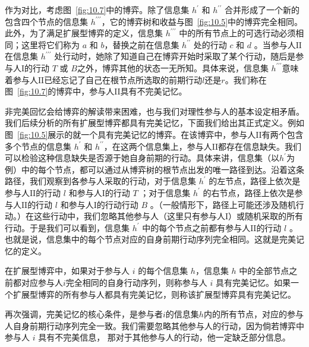 作为对比，考虑图~\ref{fig:10.7}中的博弈。除了信息集 \({h}^{\prime }\) 和 \({h}^{\prime \prime }\) 合并形成了一个新的包含四个节点的信息集 \({h}^{\prime \prime \prime }\)，它的博弈树和收益与图~\ref{fig:10.5}中的博弈完全相同。此外，为了满足扩展型博弈的定义，信息集 \({h}^{\prime \prime \prime }\) 中的所有节点上的可选行动必须相同；这里将它们称为 \(a\) 和 \(b\)，替换之前在信息集 \({h}^{\prime \prime }\) 处的行动 \(c\) 和 \(d\) 。当参与人$\mathrm{II}$在信息集 \({h}^{\prime \prime \prime }\) 处行动时，她除了知道自己在博弈开始时采取了某个行动，随后是参与人$\mathrm{I}$的行动 \(T\) 或 \(B\)之外，博弈其他的状态一无所知。具体来说，信息集 \({h}^{\prime \prime \prime}\)意味着参与人$\mathrm{II}$已经忘记了自己在根节点所选取的前期行动$l$还是$r$。我们称在图~\ref{fig:10.7}的博弈中，参与人$\mathrm{II}$具有不完美记忆。

非完美回忆会给博弈的解读带来困难，也与我们对理性参与人的基本设定相矛盾。我们后续分析的所有扩展型博弈都具有完美记忆，下面我们给出其{\color{red}正式定义}。例如图~\ref{fig:10.5}展示的就一个具有完美记忆的博弈。在该博弈中，参与人$\mathrm{II}$有两个包含多个节点的信息集 \({h}^{\prime }\) 和 \({h}^{\prime \prime }\)，在这两个信息集上，参与人$\mathrm{II}$都存在信息缺失。我们可以检验这种信息缺失是否源于她自身前期的行动。具体来讲，信息集（以\({h}^{\prime }\)为例）中的每个节点，都可以通过从博弈树的根节点出发的唯一路径到达。沿着这条路径，我们观察到各参与人采取的行动，对于信息集 \({h}^{\prime }\) 的左节点，路径上依次是参与人$\mathrm{II}$的行动 \(l\) 和参与人$\mathrm{I}$的行动 \(T\) ；对于信息集 \({h}^{\prime }\) 的右节点，路径上依次是参与人$\mathrm{II}$的行动 \(l\) 和参与人$\mathrm{I}$的行动行动 \(B\) 。（一般情形下，路径上可能还涉及随机行动。）在这些行动中，我们忽略其他参与人（这里只有参与人$\mathrm{I}$）或随机采取的所有行动。于是我们可以看到，信息集 \({h}^{\prime }\) 中的每个节点之前都有参与人$\mathrm{II}$的行动 \(l\) 。也就是说，信息集中的每个节点对应的自身前期行动序列完全相同。这就是完美记忆的定义。


\begin{definition}
\label{def:10.1}
在扩展型博弈中，如果对于参与人 \(i\) 的每个信息集 \(h\)，信息集 \(h\) 中的全部节点之前都对应参与人$i$完全相同的自身行动序列，则称参与人 \(i\) 具有完美记忆。如果一个扩展型博弈的所有参与人都具有完美记忆，则称该扩展型博弈具有完美记忆。
\end{definition}

再次强调，完美记忆的核心条件，是参与者$i$的信息集$h$内的所有节点，对应的参与人自身前期行动序列完全一致。我们需要忽略其他参与人的行动，因为倘若博弈中参与人 \(i\) 具有不完美信息，
那对于其他参与人的行动，他一定缺乏部分信息。

